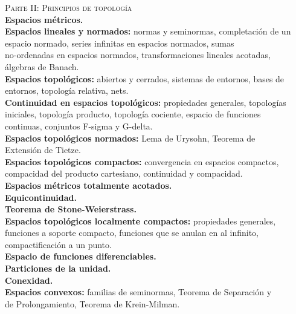 \documentclass[12pt,letterpaper]{article}
\newcommand\tab[1][1.5cm]{\hspace*{#1}}
\begin{document}
\tab \textsc{Parte II: Principios de topología}\\
\tab \qquad \textbf{Espacios métricos.}  \\
\tab \qquad \textbf{Espacios lineales y normados:} normas y seminormas, completación de un \\
	\tab \qquad \qquad espacio normado, series infinitas en espacios normados, sumas \\
	\tab \qquad \qquad no-ordenadas en espacios normados, transformaciones lineales acotadas, \\
	\tab \qquad \qquad álgebras de Banach. \\
\tab \qquad \textbf{Espacios topológicos:} abiertos y cerrados, sistemas de entornos, bases de \\
	\tab \qquad \qquad entornos, topología relativa, nets.\\
\tab \qquad \textbf{Continuidad en espacios topológicos:} propiedades generales, topologías \\
	\tab \qquad \qquad iniciales, topología producto, topología cociente, espacio de funciones \\
	\tab \qquad \qquad continuas, conjuntos F-sigma y G-delta.\\
\tab \qquad \textbf{Espacios topológicos normados:} Lema de Urysohn, Teorema de \\
	\tab \qquad \qquad Extensión de Tietze.\\
\tab \qquad \textbf{Espacios topológicos compactos:} convergencia en espacios compactos, \\ 
	\tab \qquad \qquad compacidad del producto cartesiano, continuidad y compacidad.\\
\tab \qquad \textbf{Espacios métricos totalmente acotados.}\\
\tab \qquad \textbf{Equicontinuidad.}\\
\tab \qquad \textbf{Teorema de Stone-Weierstrass.}\\
\tab \qquad \textbf{Espacios topológicos localmente compactos:} propiedades generales, \\
	\tab \qquad \qquad funciones a soporte compacto, funciones que se anulan en al infinito, \\
	\tab \qquad \qquad compactificación a un punto.\\
\tab \qquad \textbf{Espacio de funciones diferenciables.}\\
\tab \qquad \textbf{Particiones de la unidad.}\\
\tab \qquad \textbf{Conexidad.}\\
\tab \qquad \textbf{Espacios convexos:} familias de seminormas, Teorema de Separación y \\
	\tab \qquad \qquad de Prolongamiento, Teorema de Krein-Milman.\\
\end{document}
